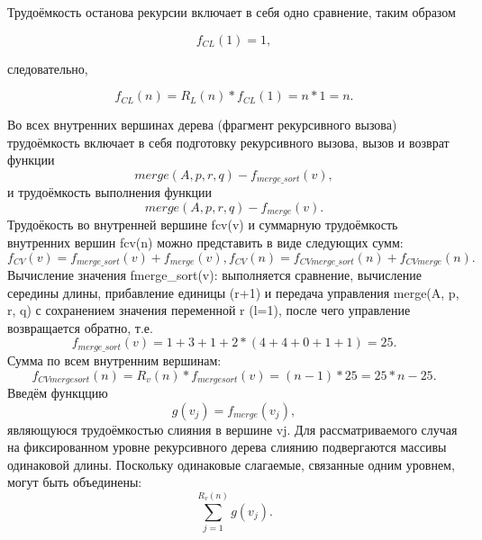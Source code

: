 \documentclass[12pt,a4paper]{scrartcl}
\begin{document}
		Трудоёмкость останова рекурсии включает в себя одно сравнение, таким образом
		
		\begin{equation*}
			f_{CL}(1) = 1,
		\end{equation*}

		следовательно,

		\begin{equation}
			\label{eq2.10}
			f_{CL}(n) = R_L(n)*f_{CL}(1) = n*1 = n.
		\end{equation}

Во всех внутренних вершинах дерева (фрагмент рекурсивного вызова) трудоёмкость включает в себя подготовку рекурсивного вызова, вызов и возврат функции 
\begin{equation*}
merge(A, p, r, q) - f_{merge\_sort}(v),
\end{equation*}
и трудоёмкость выполнения функции
\begin{equation*}
merge(A, p, r, q) - f_{merge}(v).
\end{equation*}
Трудоёкость во внутренней вершине fcv(v) и суммарную трудоёмкость внутренних вершин fcv(n) можно представить в виде следующих сумм:
\begin{equation}\label{eq2.11}
f_{CV}(v) = f_{merge\_sort}(v) + f_{merge}(v),
f_{CV}(n) = f_{CV merge\_sort}(n) + f_{CV merge}(n).
\end{equation}
Вычисление значения fmerge\_sort(v): выполняется сравнение, вычисление середины длины, прибавление единицы (r+1) и передача управления merge(A, p, r, q) с сохранением значения переменной r (l=1), после чего управление возвращается обратно, т.е.
\begin{equation}\label{eq2.12}
f_{merge\_sort}(v) = 1 + 3 + 1 + 2*(4 + 4 + 0 + 1 + 1) = 25.
\end{equation}
Сумма по всем внутренним вершинам:
\begin{equation}\label{eq2.13}
f_{CV mergesort}(n) = R_v(n)*f_{mergesort}(v) = (n-1)*25 = 25*n - 25.
\end{equation}
Введём функццию
\begin{equation}\label{eq2.14}
g(v_j) = f_{merge}(v_j),
\end{equation}
являющуюся трудоёмкостью слияния в вершине vj. Для рассматриваемого случая на фиксированном уровне рекурсивного дерева слиянию подвергаются массивы одинаковой длины. Поскольку одинаковые слагаемые, связанные одним уровнем, могут быть объединены:
\begin{equation}\label{eq2.15}
\sum \limits_{j=1}^{R_v(n)} g(v_j).
\end{equation}
\end{document}
